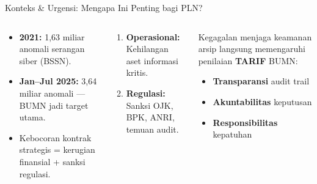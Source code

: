 \documentclass[aspectratio=169,11pt]{beamer}
\begin{document}
\begin{frame}{Konteks \& Urgensi: Mengapa Ini Penting bagi PLN?}
    \vspace{0.2cm}
    \begin{columns}[T]
        \begin{orangebox}
            \scriptsize
            \begin{itemize}
                \item \textbf{2021:} 1,63 miliar anomali serangan siber (BSSN).
                \item \textbf{Jan--Jul 2025:} 3,64 miliar anomali --- BUMN jadi target utama.
                \item Kebocoran kontrak strategis = kerugian finansial + sanksi regulasi.
            \end{itemize}
        \end{orangebox}
        \begin{premiumbox}
            \scriptsize
            \begin{enumerate}
                \item \textbf{Operasional:} Kehilangan aset informasi kritis.
                \item \textbf{Regulasi:} Sanksi OJK, BPK, ANRI, temuan audit.
            \end{enumerate}
        \end{premiumbox}
        
        \begin{greenbox}
            \scriptsize
            Kegagalan menjaga keamanan arsip langsung memengaruhi penilaian \textbf{TARIF} BUMN:
            \begin{itemize}
                \scriptsize
                \item \textbf{Transparansi} audit trail
                \item \textbf{Akuntabilitas} keputusan
                \item \textbf{Responsibilitas} kepatuhan
            \end{itemize}
        \end{greenbox}
    \end{columns}
\end{frame}
\end{document}

